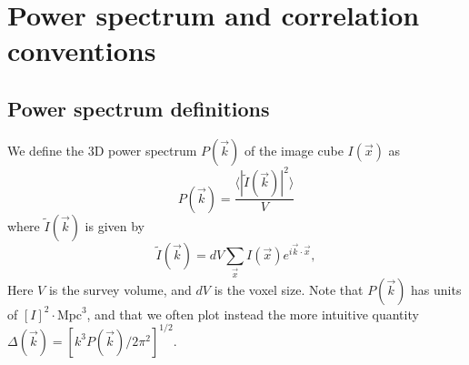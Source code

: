 \documentclass[numberedappendix]{emulateapj}
\providecommand{\DIFadd}[1]{{\protect\color{blue}\uwave{#1}}} %
\providecommand{\DIFdel}[1]{{\protect\color{red}\sout{#1}}}                      %
\providecommand{\DIFaddbegin}{} %
\providecommand{\DIFaddend}{} %
\providecommand{\DIFdelbegin}{} %
\providecommand{\DIFdelend}{} %
\begin{document}
\section{Power spectrum and correlation conventions}
\label{sec:pspecconventions}

\subsection{Power spectrum definitions}
\label{sec:pspecdefs}

We define the 3D power spectrum $P(\vec{k})$ of the image cube $I(\vec{x})$ as 
\begin{equation}
\label{eqn:pspec3Ddef}
	P(\vec{k}) = \frac{\langle|\tilde{I}(\vec{k})|^2\rangle}{V}
\end{equation}
where $\tilde{I}(\vec{k})$ is given by
\begin{equation}
	\tilde{I}(\vec{k})=dV\sum_{\vec{x}}I(\vec{x})e^{i\vec{k}\cdot\vec{x}},
\end{equation}
Here $V$ is the survey volume, and $dV$ is the voxel size. Note that $P(\vec{k})$ has units of $[I]^2\cdot\text{Mpc}^3$, and that we often plot instead the more intuitive quantity \DIFdelbegin \DIFdel{$\Delta(\vec{k})=[k^3P(\vec{k})/2\pi^2]^{1/2}$}\DIFdelend \DIFaddbegin \DIFadd{$\Delta(k)=[k^3P(k)/2\pi^2]^{1/2}$}\DIFaddend .
\end{document}
